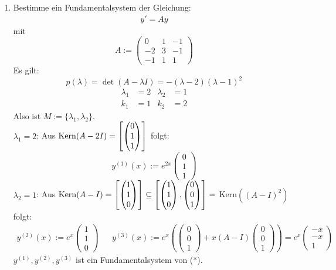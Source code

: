 \documentclass[a4paper,oneside,DIV15,BCOR12mm,chapterprefix=true,headings=onelinechapter]{scrbook}
\begin{document}
\begin{enumerate}
\item Bestimme ein Fundamentalsystem der Gleichung:
\begin{align*}
\tag{$\ast $} y' = Ay
\end{align*}
mit
\[A:=\begin{pmatrix} 0 & 1 & -1 \\ -2 & 3 & -1 \\ -1 & 1 & 1 \end{pmatrix}\]
Es gilt:
\[p(\lambda)=\det(A-\lambda I) = -(\lambda - 2)(\lambda - 1)^2\]
\begin{align*}
\lambda_1 &= 2 &\lambda_2&=1\\
k_1&=1 &k_2&=2
\end{align*}
Also ist $M := \{\lambda_1, \lambda_2\}$.\\
\boldmath $\lambda_1 = 2$\unboldmath: Aus $\mathop{\rm Kern}\nolimits(A-2I) = 
\left[ \begin{pmatrix} 0 \\ 1\\1 \end{pmatrix} \right]$ folgt:
\[y^{(1)}(x) := e^{2x}\begin{pmatrix} 0 \\ 1\\1 \end{pmatrix}\]
\boldmath $\lambda_2 = 1$\unboldmath: Aus $\mathop{\rm Kern}\nolimits(A-I) = 
\left[ \begin{pmatrix} 1 \\ 1\\0 \end{pmatrix} \right]
\subseteq \left[ \begin{pmatrix} 1\\1\\0 \end{pmatrix}, 
\begin{pmatrix} 0\\0\\1\end{pmatrix} \right] = $ Kern$((A -I)^2)$ folgt:
\begin{align*}
y^{(2)}(x) := e^x \begin{pmatrix} 1\\1\\0 \end{pmatrix} && 
y^{(3)}(x) := e^x\left( \begin{pmatrix} 0\\0\\1\end{pmatrix} + x(A-I) \begin{pmatrix} 0\\0\\1\end{pmatrix} \right) = e^x \begin{pmatrix} -x \\ -x \\ 1 \end{pmatrix}
\end{align*}
$y^{(1)}, y^{(2)}, y^{(3)}$ ist ein Fundamentalsystem von ($\ast$).


\end{enumerate}
\end{document}
